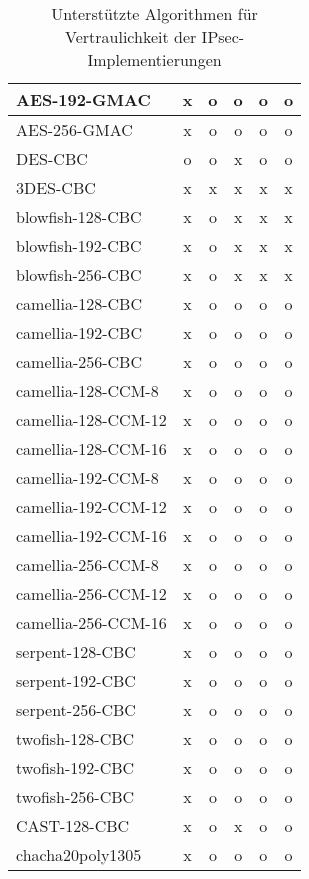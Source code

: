 \begin{center}
\begin{table}[h]
\begin{tabularx}{350pt}{|X|c|c|c|c|c|}
AES-192-GMAC         &  x  & o & o & o & o \\  \hline
AES-256-GMAC         &  x  & o & o & o & o \\  \hline
DES-CBC              &  o  & o & x & o & o \\  \hline
3DES-CBC             &  x  & x & x & x & x \\  \hline
blowfish-128-CBC     &  x  & o & x & x & x \\  \hline
blowfish-192-CBC     &  x  & o & x & x & x \\  \hline
blowfish-256-CBC     &  x  & o & x & x & x \\  \hline
camellia-128-CBC     &  x  & o & o & o & o \\  \hline
camellia-192-CBC     &  x  & o & o & o & o \\  \hline
camellia-256-CBC     &  x  & o & o & o & o \\  \hline
camellia-128-CCM-8   &  x  & o & o & o & o \\  \hline
camellia-128-CCM-12  &  x  & o & o & o & o \\  \hline
camellia-128-CCM-16  &  x  & o & o & o & o \\  \hline
camellia-192-CCM-8   &  x  & o & o & o & o \\  \hline
camellia-192-CCM-12  &  x  & o & o & o & o \\  \hline
camellia-192-CCM-16  &  x  & o & o & o & o \\  \hline
camellia-256-CCM-8   &  x  & o & o & o & o \\  \hline
camellia-256-CCM-12  &  x  & o & o & o & o \\  \hline
camellia-256-CCM-16  &  x  & o & o & o & o \\  \hline
serpent-128-CBC      &  x  & o & o & o & o \\  \hline
serpent-192-CBC      &  x  & o & o & o & o \\  \hline
serpent-256-CBC      &  x  & o & o & o & o \\  \hline
twofish-128-CBC      &  x  & o & o & o & o \\  \hline
twofish-192-CBC      &  x  & o & o & o & o \\  \hline
twofish-256-CBC      &  x  & o & o & o & o \\  \hline
CAST-128-CBC         &  x  & o & x & o & o \\  \hline
chacha20poly1305     &  x  & o & o & o & o \\  \hline
\end{tabularx}
\label{tab:IPsec-Implementierungen-Vertraulichkeit-Algorithmen}
\caption{Unterstützte Algorithmen für Vertraulichkeit der IPsec-Implementierungen}
\end{table}


\end{center}
